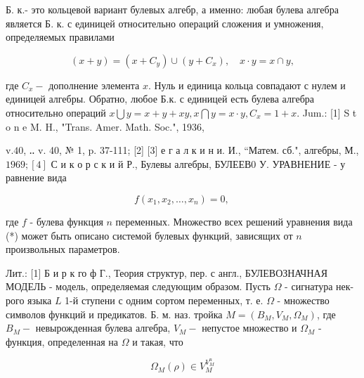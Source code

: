 \documentclass[10pt]{article}
\begin{document}
Б. к.- это кольцевой вариант булевых алгебр, а именно: любая булева алгебра является Б. к. с единицей относительно операций сложения и умножения, определяемых правилами



\[

(x+y)=\left(x+C_{y}\right) \cup\left(y+C_{x}\right), \quad x \cdot y=x \cap y,

\]



где $C_{x}-$ дополнение элемента $x$. Нуль и единица кольца совпадают с нулем и единицей алгебры. Обратно, любое Б.к. с единицей есть булева алгебра относительно операций $x \bigcup y=x+y+x y, x \bigcap y=x \cdot y, C_{x}=1+x$. Jum.: [1] S t o n e M. H., "Trans. Amer. Math. Soc.", 1936,

$\mathrm{v} .40$, ‥ v. 40, № 1, p. 37-111; [2] [3] е г а л к и н и. И., “Матем. сб.", алгебры, М., $1969 ;[4]$ С и к о р с к и й Р., Булевы алгебры, БУЛЕЕВ0 У. УРАВНЕНИЕ - у равнение вида



\[

f\left(x_{1}, x_{2}, \ldots, x_{n}\right)=0 \text {, }

\]



где $f$ - булева функция $n$ переменных. Множество всех решений уравнения вида (*) может быть описано системой булевых функций, зависящих от $n$ произвольных параметров.



Лит.: [1] Б и р к го ф Г., Теория структур, пер. с англ., БУЛЕВОЗНАЧНАЯ МОДЕЛЬ - модель, определяемая следующим образом. Пусть $\Omega$ - сигнатура нек-рого языка $L$ 1-й ступени с одним сортом переменных, т. е. $\Omega$ - множество символов функций и предикатов. Б. м. наз. тройка $M=\left(B_{M}, V_{M}, \Omega_{M}\right)$, где $B_{M}-$ невырожденная булева алгебра, $V_{M}-$ непустое множество и $\Omega_{M}$ - функция, определенная на $\Omega$ и такая, что



\[

\Omega_{M}(\rho) \in V_{M}^{V_{M}^{n}}

\]
\end{document}
